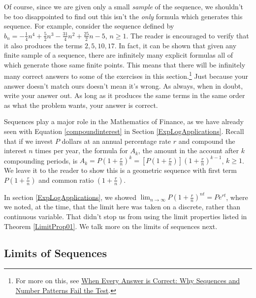 \documentclass{ximera}
\begin{document}
Of course, since we are given only a small \textit{sample} of the sequence, we shouldn't be too disappointed to find out this isn't the \textit{only} formula which generates this sequence.  For example, consider the sequence defined by $b_{n} = -\frac{1}{4} n^4 + \frac{5}{2} n^3 - \frac{31}{4} n^2 + \frac{25}{2} n - 5$, $n \geq 1$.  The reader is encouraged to verify that it also produces the  terms  $2, 5, 10, 17$.  In fact, it can be shown that given any finite sample of a sequence, there are infinitely many explicit formulas all of which generate those same finite points.  This means that there will be infinitely many correct answers to some of the exercises in this section.\footnote{For more on this, see \href{http://www.math.kent.edu/~white/papers/pattern.pdf}{\underline{When Every Answer is Correct: Why
Sequences and Number Patterns Fail the Test}}.}  Just because your answer doesn't match ours doesn't mean it's wrong.  As always, when in doubt, write your answer out.  As long as it produces the same terms in the same order as what the problem wants, your answer is correct.  

 

Sequences play a major role in the Mathematics of Finance, as we have already seen with Equation \ref{compoundinterest} in Section \ref{ExpLogApplications}.  Recall that if we invest $P$ dollars at an annual percentage rate $r$ and compound the interest $n$ times per year,  the formula for $A_{k}$, the amount in the account after $k$ compounding periods, is $A_{k} = P\left(1 + \frac{r}{n}\right)^{k} = \left[P\left(1 + \frac{r}{n}\right)\right]\left(1 + \frac{r}{n}\right)^{k-1}$, $ k \geq 1$.  We leave it to the reader to show this is a geometric sequence with first term $P\left(1 + \frac{r}{n}\right)$ and common ratio $\left(1 + \frac{r}{n}\right)$. 



 In section \ref{ExpLogApplications}, we showed $\lim_{n \rightarrow \infty} P\left(1 + \frac{r}{n}\right)^{nt} = Pe^{rt}$, where we noted, at the time, that the limit here was taken on a discrete, rather than continuous variable.  That didn't stop us from using the limit properties listed in Theorem \ref{LimitProp01}.  We talk more on the limits of sequences next.


\subsection{Limits of Sequences}
\label{sequencelimits}
\end{document}
